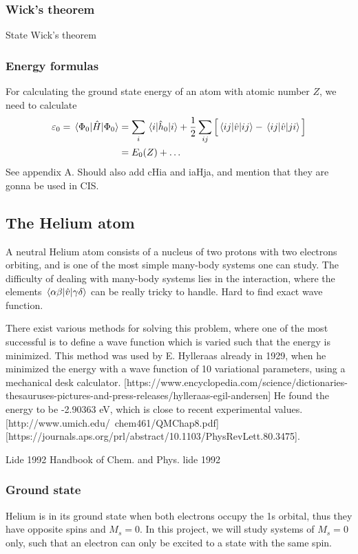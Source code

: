 \subsubsection{Wick's theorem}
State Wick's theorem 

\subsubsection{Energy formulas}
For calculating the ground state energy of an atom with atomic number $Z$, we need to calculate
\begin{align}
	\varepsilon_0=\mel{\Phi_0}{\hat{H}}{\Phi_0}&=\sum_i\mel{i}{\hat{h}_0}{i}+\frac{1}{2}\sum_{ij}\Big[\mel{ij}{\hat{v}}{ij}-\mel{ij}{\hat{v}}{ji}\Big]\\
	&=E_0(Z)+\hdots
\end{align}
See appendix A. 
Should also add cHia and iaHja, and mention that they are gonna be used in CIS.

\subsection{The Helium atom}
A neutral Helium atom consists of a nucleus of two protons with two electrons orbiting, and is one of the most simple many-body systems one can study. The difficulty of dealing with many-body systems lies in the interaction, where the elements $\mel{\alpha\beta}{\hat{v}}{\gamma\delta}$ can be really tricky to handle. Hard to find exact wave function. 

There exist various methods for solving this problem, where one of the most successful is to define a wave function which is varied such that the energy is minimized. This method was used by E. Hylleraas already in 1929, when he minimized the energy with a wave function of 10 variational parameters, using a mechanical desk calculator. [https://www.encyclopedia.com/science/dictionaries-thesauruses-pictures-and-press-releases/hylleraas-egil-andersen] He found the energy to be -2.90363 eV, which is close to recent experimental values. [http://www.umich.edu/~chem461/QMChap8.pdf][https://journals.aps.org/prl/abstract/10.1103/PhysRevLett.80.3475]. 




Lide 1992
Handbook of Chem. and Phys. lide 1992



\subsubsection{Ground state}
Helium is in its ground state when both electrons occupy the 1s orbital, thus they have opposite spins and $M_s=0$. In this project, we will study systems of $M_s=0$ only, such that an electron can only be excited to a state with the same spin. 

